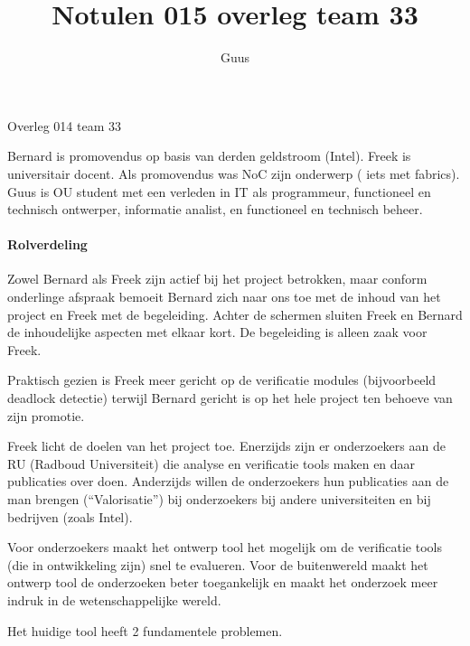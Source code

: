 \documentclass[a4paper,final]{article}
\title{Notulen 015 overleg team 33}
\author{Guus}
\begin{document}

\begin{Minutes}{Overleg 014 team 33}

\maketitle%


Bernard is promovendus op basis van derden geldstroom (Intel). Freek is
universitair docent. Als promovendus was NoC zijn onderwerp ( iets met
fabrics). Guus is OU student met een verleden in IT als programmeur,
functioneel en technisch ontwerper, informatie analist, en functioneel en
technisch beheer.

\paragraph{Rolverdeling} Zowel Bernard als Freek zijn actief bij het project
betrokken, maar conform onderlinge afspraak bemoeit Bernard zich naar ons toe
met de inhoud van het project en Freek met de begeleiding. 
Achter de schermen sluiten Freek en Bernard de inhoudelijke aspecten met elkaar kort.
De begeleiding is alleen zaak voor Freek.

Praktisch gezien is Freek meer gericht op de verificatie modules (bijvoorbeeld
deadlock detectie) terwijl Bernard gericht is op het hele project ten behoeve
van zijn promotie. 

 Freek licht de doelen van het project toe. Enerzijds
zijn er onderzoekers aan de RU (Radboud Universiteit) die analyse en
verificatie tools maken en daar publicaties over doen.  Anderzijds willen de
onderzoekers hun publicaties aan de man brengen (``Valorisatie'') bij
onderzoekers bij andere universiteiten en bij bedrijven (zoals Intel). 

Voor onderzoekers maakt het ontwerp tool het mogelijk om de verificatie tools
(die in ontwikkeling zijn) snel te evalueren. Voor de buitenwereld
maakt het ontwerp tool de onderzoeken beter toegankelijk en 
maakt het onderzoek meer indruk in de wetenschappelijke wereld. 


Het huidige tool heeft 2 fundamentele problemen. 


\end{Minutes}
\end{document}
